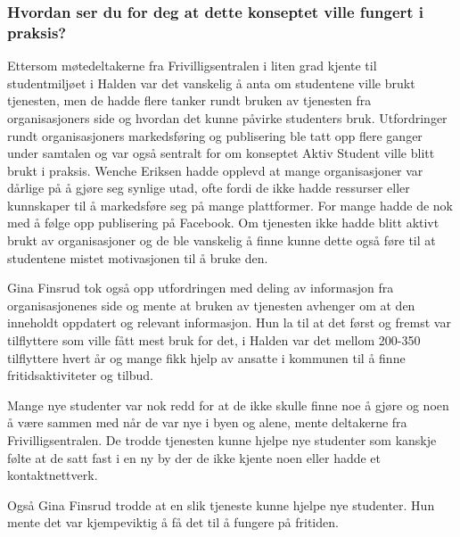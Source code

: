 \subsubsection{Hvordan ser du for deg at dette konseptet ville fungert i praksis?}

\setlength{\leftskip}{2em}
Ettersom møtedeltakerne fra Frivilligsentralen i liten grad kjente til studentmiljøet i Halden var det vanskelig å anta om studentene ville brukt tjenesten, men de hadde flere tanker rundt bruken av tjenesten fra organisasjoners side og hvordan det kunne påvirke studenters bruk. Utfordringer rundt organisasjoners markedsføring og publisering ble tatt opp flere ganger under samtalen og var også sentralt for om konseptet Aktiv Student ville blitt brukt i praksis. Wenche Eriksen hadde opplevd at mange organisasjoner var dårlige på å gjøre seg synlige utad, ofte fordi de ikke hadde ressurser eller kunnskaper til å markedsføre seg på mange plattformer. For mange hadde de nok med å følge opp publisering på Facebook. Om tjenesten ikke hadde blitt aktivt brukt av organisasjoner og de ble vanskelig å finne kunne dette også føre til at studentene mistet motivasjonen til å bruke den. \cite{FRIVILLIGSENTRALEN-INTERVJU:21}

Gina Finsrud tok også opp utfordringen med deling av informasjon fra organisasjonenes side og mente at bruken av tjenesten avhenger om at den inneholdt oppdatert og relevant informasjon. Hun la til at det først og fremst var tilflyttere som ville fått mest bruk for det, i Halden var det mellom 200-350 tilflyttere hvert år og mange fikk hjelp av ansatte i kommunen til å finne fritidsaktiviteter og tilbud. \cite{KOMMUNEN-INTERVJU:20}

Mange nye studenter var nok redd for at de ikke skulle finne noe å gjøre og noen å være sammen med når de var nye i byen og alene, mente deltakerne fra Frivilligsentralen. De trodde tjenesten kunne hjelpe nye studenter som kanskje følte at de satt fast i en ny by der de ikke kjente noen eller hadde et kontaktnettverk. \cite{FRIVILLIGSENTRALEN-INTERVJU:21}

Også Gina Finsrud trodde at en slik tjeneste kunne hjelpe nye studenter. Hun mente det var kjempeviktig å få det til å fungere på fritiden. \cite{KOMMUNEN-INTERVJU:20}


